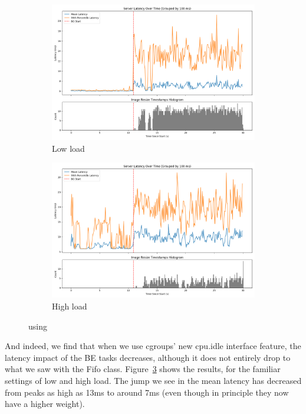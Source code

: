 \begin{figure}[t]
    \centering
    \begin{subfigure}[t]{0.48\textwidth}
        \includegraphics[width=\textwidth]{graphs/unedited-idle-low-two.png}
        \caption{Low load}\label{fig:unedited-idle-low-two}
    \end{subfigure}
    \hspace{\fill}
    \begin{subfigure}[t]{0.48\textwidth}
        \includegraphics[width=\textwidth]{graphs/unedited-idle-high-two.png}
        \caption{High load}\label{fig:unedited-idle-high-two}
    \end{subfigure}
    \caption{using \schedidle{}}\label{fig:unedited-idle}
\end{figure}

And indeed, we find that when we use cgroups' new cpu.idle interface feature,
the latency impact of the BE tasks decreases, although it does not entirely drop
to what we saw with the Fifo class. Figure~\ref{fig:unedited-idle} shows the
results, for the familiar settings of low and high load. The jump we see in the
mean latency has decreased from peaks as high as 13ms to around 7ms (even though
in principle they now have a higher weight).


